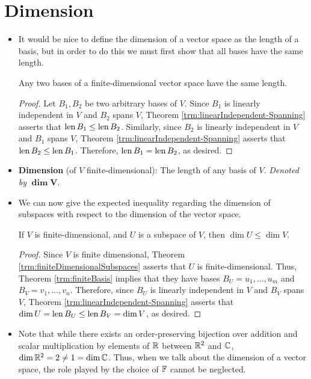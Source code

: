 \documentclass[../main.tex]{subfiles}
\begin{document}
\section{Dimension}
\begin{itemize}
    \item It would be nice to define the dimension of a vector space as the length of a basis, but in order to do this we must first show that all bases have the same length.
    \begin{theorem}\label{trm:sameBasisLength}
        Any two bases of a finite-dimensional vector space have the same length.
        \begin{proof}
            Let $B_1,B_2$ be two arbitrary bases of $V$. Since $B_1$ is linearly independent in $V$ and $B_2$ spans $V$, Theorem \ref{trm:linearIndependent-Spanning} asserts that $\operatorname{len} B_1\leq\operatorname{len} B_2$. Similarly, since $B_2$ is linearly independent in $V$ and $B_1$ spans $V$, Theorem \ref{trm:linearIndependent-Spanning} asserts that $\operatorname{len} B_2\leq\operatorname{len} B_1$. Therefore, $\operatorname{len} B_1=\operatorname{len} B_2$, as desired.
        \end{proof}
    \end{theorem}
    \item \textbf{Dimension} (of $V$ finite-dimensional): The length of any basis of $V$. \emph{Denoted by} $\bm{\dim V}$.
    \item We can now give the expected inequality regarding the dimension of subspaces with respect to the dimension of the vector space.
    \begin{theorem}
        If $V$ is finite-dimensional, and $U$ is a subspace of $V$, then $\dim U\leq\dim V$.
        \begin{proof}
            Since $V$ is finite dimensional, Theorem \ref{trm:finiteDimensionalSubspaces} asserts that $U$ is finite-dimensional. Thus, Theorem \ref{trm:finiteBasis} implies that they have bases $B_U=u_1,\dots,u_m$ and $B_V=v_1,\dots,v_n$. Therefore, since $B_U$ is linearly independent in $V$ and $B_V$ spans $V$, Theorem \ref{trm:linearIndependent-Spanning} asserts that $\dim U=\operatorname{len} B_U\leq\operatorname{len} B_V=\dim V$, as desired.
        \end{proof}
    \end{theorem}
    \item Note that while there exists an order-preserving bijection over addition and scalar multiplication by elements of $\mathbb{R}$ between $\mathbb{R}^2$ and $\mathbb{C}$, $\dim\mathbb{R}^2=2\neq 1=\dim\mathbb{C}$. Thus, when we talk about the dimension of a vector space, the role played by the choice of $\mathbb{F}$ cannot be neglected.

\end{itemize}
\end{document}
